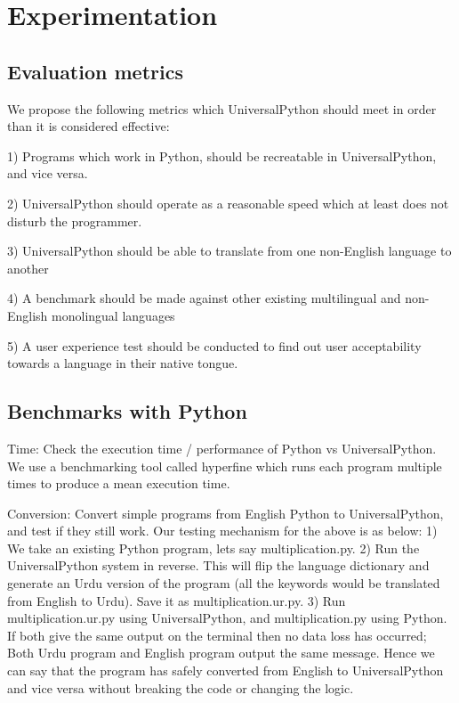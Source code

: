 \documentclass[conference]{IEEEtran}
\begin{document}
\section{Experimentation}

\subsection{Evaluation metrics}\label{AA}

We propose the following metrics which UniversalPython should meet in order than it is considered effective:

1) Programs which work in Python, should be recreatable in UniversalPython, and vice versa.

2) UniversalPython should operate as a reasonable speed which at least does not disturb the programmer.

3) UniversalPython should be able to translate from one non-English language to another

4) A benchmark should be made against other existing multilingual and non-English monolingual languages

5) A user experience test should be conducted to find out user acceptability towards a language in their native tongue.

\subsection{Benchmarks with Python}\label{BB}

Time: Check the execution time / performance of Python vs UniversalPython. We use a benchmarking tool called hyperfine which runs each program multiple times to produce a mean execution time.

Conversion: Convert simple programs from English Python to UniversalPython, and test if they still work. Our testing mechanism for the above is as below:
1) We take an existing Python program, lets say multiplication.py.
2) Run the UniversalPython system in reverse. This will flip the language dictionary and generate an Urdu version of the program (all the keywords would be translated from English to Urdu). Save it as multiplication.ur.py.
3) Run multiplication.ur.py using UniversalPython, and multiplication.py using Python. If both give the same output on the terminal then no data loss has occurred; Both Urdu program and English program output the same message. Hence we can say that the program has safely converted from English to UniversalPython and vice versa without breaking the code or changing the logic.
\end{document}
